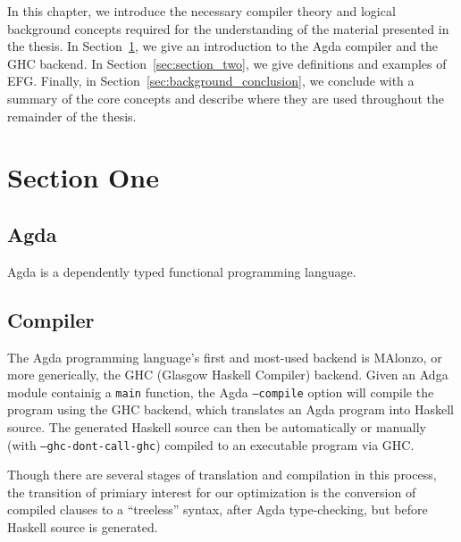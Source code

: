 

In this chapter, we introduce the necessary compiler theory and logical background concepts required for the understanding of the material presented in the thesis. In Section~\ref{sec:section_one}, we give an introduction to the Agda compiler and the GHC backend. In Section~\ref{sec:section_two}, we give definitions and examples of EFG. Finally, in Section~\ref{sec:background_conclusion}, we conclude with a summary of the core concepts and describe where they are used throughout the remainder of the thesis.

\section{Section One}
\label{sec:section_one}

\subsection{Agda}

Agda is a dependently typed functional programming language.



\subsection{Compiler}

The Agda programming language's first and most-used backend is MAlonzo, or more generically, the GHC (Glasgow Haskell Compiler) backend.\cite{benke2007} Given an Adga module containig a \lstinline{main} function, the Agda \texttt{--compile} option will compile the program using the GHC backend, which translates an Agda program into Haskell source. The generated Haskell source can then be automatically or manually (with \texttt{--ghc-dont-call-ghc}) compiled to an executable program via GHC.\cite{agdadocs} \newline %

Though there are several stages of translation and compilation in this process, the transition of primiary interest for our optimization is the conversion of compiled clauses to a ``treeless'' syntax, after Agda type-checking, but before Haskell source is generated. \newline

